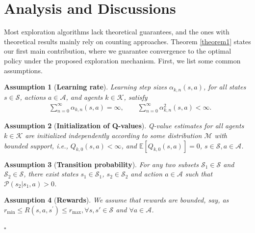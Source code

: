 \documentclass[lettersize,journal]{IEEEtran}
\newtheorem{assumption}{Assumption}
\newcommand*{\QEDA}{\hfill \ensuremath{\square}}
\begin{document}
\section{Analysis and Discussions}
Most exploration algorithms lack theoretical guarantees, and the ones with theoretical results mainly rely on counting approaches. Theorem \ref{theorem1} states our first main contribution, where we guarantee convergence to the optimal policy under the proposed exploration mechanism.  First, we list some common assumptions.
\begin{assumption}[\textbf{Learning rate}]
\label{assumption:step}
Learning step sizes $\alpha_{k,n}(s,a)$,  for all states $s\in\mathcal{S}$, actions $a\in\mathcal{A}$, and agents  $k\in \mathcal{K}$, satisfy
\begin{align}
    &\sum \limits_{n=0}^\infty \alpha_{k,n}(s,a)=\infty,\nonumber\quad \quad \sum \limits_{n=0}^\infty \alpha_{k,n}^2(s,a)<\infty.\nonumber
\end{align} 
\end{assumption}
\begin{assumption}[\textbf{Initialization of Q-values}]
\label{assumption:initial}
    Q-value estimates for all agents $k\in \mathcal{K}$  are initialized  independently according to some distribution $\mathcal{M}$ with bounded support, i.e., $Q_{k,0}(s,a)<\infty$, and $\mathbb{E}\left[Q_{k,0}(s,a)\right]=0$, $s\in\mathcal{S}, a\in\mathcal{A}$. \par 
\end{assumption}

\begin{assumption}[\textbf{Transition probability}]
\label{assumption:trans}
 For any two subsets $\mathcal{S}_1\in \mathcal{S}$  and $\mathcal{S}_2\in\mathcal{S}$, there exist states $s_1\in \mathcal{S}_1$, $s_2\in \mathcal{S}_2$ and action $a \in \mathcal{A}$ such that $\mathcal{P}(s_2|s_1,a)>0$. \par  %
 
\end{assumption}
\begin{assumption}[\textbf{Rewards}]
\label{assumption:reward}
 We assume that rewards are bounded, say, as   $r_{\min } \leq R\left(s, a, s^{\prime}\right) \leq r_{\max }, \forall s,s'\in\mathcal{S}$ and $ \forall a\in \mathcal{A}$. \par
 \QEDA
\end{assumption} 
\end{document}
